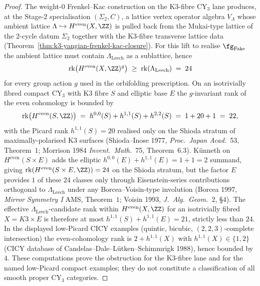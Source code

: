 \begin{proof}
The weight-$0$ Frenkel--Kac construction on the K3-fibre CY$_3$ lane
produces, at the Stage-$2$ specialisation $(\Sigma_2,C)$, a lattice
vertex operator algebra $V_{\Lambda}$ whose ambient lattice
$\Lambda \hookrightarrow H^{\mathrm{even}}(X, \ZZ)$ is pulled back from
the Mukai-type lattice of the $2$-cycle datum $\Sigma_2$ together with
the K3-fibre transverse lattice data
(Theorem~\ref{thm:k3-yangian-frenkel-kac-closure}). For this lift to realise
$\fg_{\mathrm{Fake}}$ the ambient lattice must contain $\Lambda_{\mathrm{Leech}}$
as a sublattice, hence
\[
 \mathrm{rk}\bigl( H^{\mathrm{even}}(X, \ZZ)^{g} \bigr) \;\geq\; \mathrm{rk}(\Lambda_{\mathrm{Leech}}) \;=\; 24
\]
for every group action $g$ used in the orbifolding prescription. On an
isotrivially fibred compact CY$_3$ with K3 fibre $S$ and elliptic base
$E$ the $g$-invariant rank of the even cohomology is bounded by
\[
 \mathrm{rk}\bigl( H^{\mathrm{even}}(S, \ZZ) \bigr)
 \;=\; h^{0, 0}(S) + h^{1, 1}(S) + h^{2, 2}(S)
 \;=\; 1 + 20 + 1 \;=\; 22,
\]
with the Picard rank $h^{1, 1}(S) = 20$ realised only on the Shioda
stratum of maximally-polarised K3 surfaces (Shioda--Inose 1977,
\emph{Proc.\ Japan Acad.}~53, Theorem~$1$; Morrison 1984 \emph{Invent.\
Math.}~75, Theorem~$6.3$). K\"unneth on $H^{\mathrm{even}}(S \times E)$
adds the elliptic $h^{0, 0}(E) + h^{1, 1}(E) = 1 + 1 = 2$ summand,
giving $\mathrm{rk}(H^{\mathrm{even}}(S \times E, \ZZ)) = 24$ on the
Shioda stratum, but the factor $E$ provides $1$ of these $24$ classes
only through Eisenstein-series contributions orthogonal to
$\Lambda_{\mathrm{Leech}}$ under any Borcea--Voisin-type involution
(Borcea 1997, \emph{Mirror Symmetry I} AMS, Theorem~$1$; Voisin 1993,
\emph{J.\ Alg.\ Geom.}~$2$, \S$4$). The effective $\Lambda_{\mathrm{Leech}}$-candidate
rank within $H^{\mathrm{even}}(X, \ZZ)$ for an isotrivially fibred
$X = K3 \times E$ is therefore at most $h^{1, 1}(S) + h^{1, 1}(E) = 21$,
strictly less than $24$. In the displayed low-Picard CICY examples
(quintic, bicubic, $(2,2,3)$-complete intersection) the even-cohomology
rank is $2+h^{1,1}(X)$ with $h^{1,1}(X)\in\{1,2\}$ (CICY database
of Candelas--Dale--L\"utken--Schimmrigk 1988), hence bounded by $4$.
These computations prove the obstruction for the K3-fibre lane and for
the named low-Picard compact examples; they do not constitute a
classification of all smooth proper CY$_3$ categories.


\end{proof}
